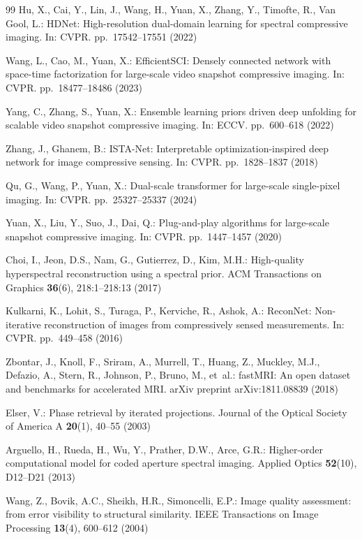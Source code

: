 \documentclass[runningheads]{llncs}
\begin{document}
\begin{thebibliography}{99}
Hu, X., Cai, Y., Lin, J., Wang, H., Yuan, X., Zhang, Y., Timofte, R., Van Gool, L.:
HDNet: High-resolution dual-domain learning for spectral compressive imaging.
In: CVPR. pp.~17542--17551 (2022)

Wang, L., Cao, M., Yuan, X.:
EfficientSCI: Densely connected network with space-time factorization for large-scale video snapshot compressive imaging.
In: CVPR. pp.~18477--18486 (2023)

Yang, C., Zhang, S., Yuan, X.:
Ensemble learning priors driven deep unfolding for scalable video snapshot compressive imaging.
In: ECCV. pp.~600--618 (2022)

Zhang, J., Ghanem, B.:
ISTA-Net: Interpretable optimization-inspired deep network for image compressive sensing.
In: CVPR. pp.~1828--1837 (2018)

Qu, G., Wang, P., Yuan, X.:
Dual-scale transformer for large-scale single-pixel imaging.
In: CVPR. pp.~25327--25337 (2024)

Yuan, X., Liu, Y., Suo, J., Dai, Q.:
Plug-and-play algorithms for large-scale snapshot compressive imaging.
In: CVPR. pp.~1447--1457 (2020)

Choi, I., Jeon, D.S., Nam, G., Gutierrez, D., Kim, M.H.:
High-quality hyperspectral reconstruction using a spectral prior.
ACM Transactions on Graphics \textbf{36}(6), 218:1--218:13 (2017)

Kulkarni, K., Lohit, S., Turaga, P., Kerviche, R., Ashok, A.:
ReconNet: Non-iterative reconstruction of images from compressively sensed measurements.
In: CVPR. pp.~449--458 (2016)

Zbontar, J., Knoll, F., Sriram, A., Murrell, T., Huang, Z., Muckley, M.J., Defazio, A., Stern, R., Johnson, P., Bruno, M., et~al.:
fastMRI: An open dataset and benchmarks for accelerated MRI.
arXiv preprint arXiv:1811.08839 (2018)

Elser, V.:
Phase retrieval by iterated projections.
Journal of the Optical Society of America A \textbf{20}(1), 40--55 (2003)

Arguello, H., Rueda, H., Wu, Y., Prather, D.W., Arce, G.R.:
Higher-order computational model for coded aperture spectral imaging.
Applied Optics \textbf{52}(10), D12--D21 (2013)

Wang, Z., Bovik, A.C., Sheikh, H.R., Simoncelli, E.P.:
Image quality assessment: from error visibility to structural similarity.
IEEE Transactions on Image Processing \textbf{13}(4), 600--612 (2004)


\end{thebibliography}
\end{document}
